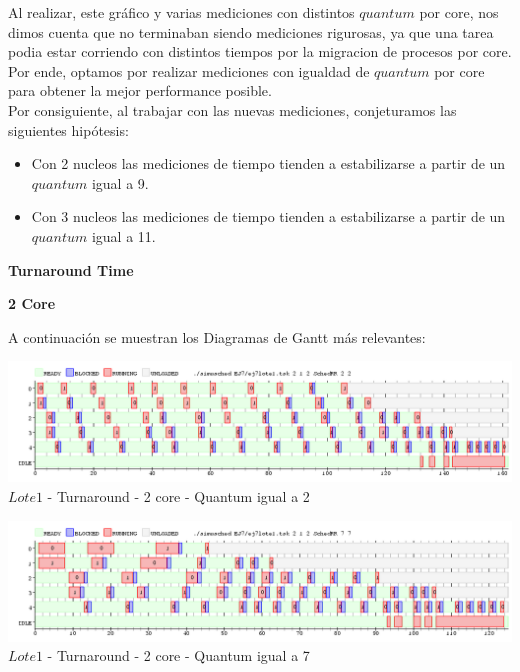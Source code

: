 \indent Al realizar, este gráfico y varias mediciones con distintos $quantum$ por core, nos dimos cuenta que no terminaban
siendo mediciones rigurosas, ya que una tarea podia estar corriendo con distintos tiempos por la migracion de procesos por core.\\
\indent Por ende, optamos por realizar mediciones con igualdad de $quantum$ por core para obtener la mejor performance posible.\\
 
 \indent Por consiguiente, al trabajar con las nuevas mediciones, conjeturamos las siguientes hipótesis:
 
 \begin{itemize}
  \item Con 2 nucleos las mediciones de tiempo tienden a estabilizarse a partir de un $quantum$ igual a 9.
  \item Con 3 nucleos las mediciones de tiempo tienden a estabilizarse a partir de un $quantum$ igual a 11.
 \end{itemize}
 \begin{center}
 \textbf{Turnaround Time} 
  \end{center}

 \begin{center}
 \textbf{2 Core}
 \end{center}
  A continuación se muestran los Diagramas de Gantt más relevantes:
  
  \begin{center}
    	\includegraphics[width=450pt]{./EJ7/ej7tour2core1quan.png}
	{$Lote 1$ - Turnaround - 2 core - Quantum igual a 2}	
 \end{center}

   \begin{center}
    	\includegraphics[width=450pt]{./EJ7/ej7tour2core3quan.png}
	{$Lote 1$ - Turnaround - 2 core - Quantum igual a 7}	
 \end{center}
 
